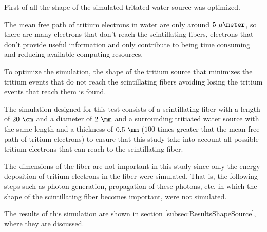 First of all the shape of the simulated tritated water source was optimized. 

The mean free path of tritium electrons in water are only around $5~\mu\meter$, so there are many electrons that don't reach the scintillating fibers, electrons that don't provide useful information and only contribute to being time consuming and reducing available computing resources.

To optimize the simulation, the shape of the tritium source that minimizes the tritium events that do not reach the scintillating fibers avoiding losing the tritium events that reach them is found.

The simulation designed for this test consists of a scintillating fiber with a length of $20~\cm$ and a diameter of $2~\mm$ and a surrounding tritiated water source with the same length and a thickness of $0.5~\mm$ ($100$ times greater that the mean free path of tritium electrons) to ensure that this study take into account all possible tritium electrons that can reach to the scintillating fiber. 

The dimensions of the fiber are not important in this study since only the energy deposition of tritium electrons in the fiber were simulated. That is, the following steps such as photon generation, propagation of these photons, etc. in which the shape of the scintillating fiber becomes important, were not simulated.


The results of this simulation are shown in section \ref{subsec:ResultsShapeSource}, where they are discussed.
